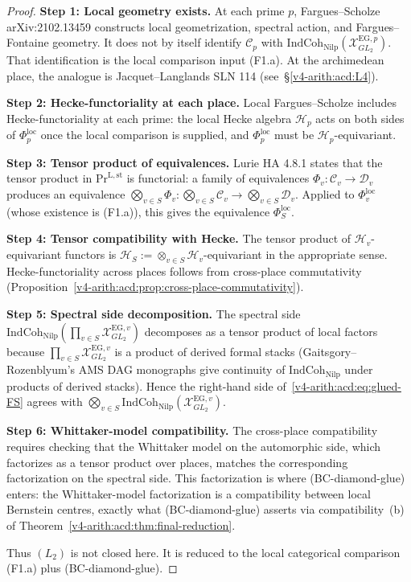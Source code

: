 \begin{proof}
\textbf{Step 1: Local geometry exists.} At each prime \(p\),
Fargues--Scholze arXiv:2102.13459 constructs local geometrization,
spectral action, and Fargues--Fontaine geometry. It does not by
itself identify \(\mathcal{C}_{p}\) with
\(\mathrm{IndCoh}_{\mathrm{Nilp}}(\mathcal{X}^{\mathrm{EG},p}_{GL_{2}})\).
That identification is the local comparison input (F1.a). At the
archimedean place, the analogue is Jacquet--Langlands SLN 114
(see~\S\ref{v4-arith:acd:L4}).

\textbf{Step 2: Hecke-functoriality at each place.} Local
Fargues--Scholze includes Hecke-functoriality at each prime: the
local Hecke algebra \(\mathcal{H}_{p}\) acts on both sides of
\(\Phi_{p}^{\mathrm{loc}}\) once the local comparison is supplied, and
\(\Phi_{p}^{\mathrm{loc}}\) must be
\(\mathcal{H}_{p}\)-equivariant.

\textbf{Step 3: Tensor product of equivalences.} Lurie HA 4.8.1
states that the tensor product in \(\mathrm{Pr}^{\mathrm{L,st}}\) is
functorial: a family of equivalences
\(\Phi_{v}:\mathcal{C}_{v}\to\mathcal{D}_{v}\) produces an equivalence
\(\bigotimes_{v\in S}\Phi_{v}:\bigotimes_{v\in S}\mathcal{C}_{v}\to\bigotimes_{v\in S}\mathcal{D}_{v}\).
Applied to \(\Phi_{v}^{\mathrm{loc}}\) (whose existence is (F1.a)),
this gives the equivalence \(\Phi_{S}^{\mathrm{loc}}\).

\textbf{Step 4: Tensor compatibility with Hecke.} The tensor product
of \(\mathcal{H}_{v}\)-equivariant functors is
\(\mathcal{H}_{S}:=\otimes_{v\in S}\mathcal{H}_{v}\)-equivariant in the
appropriate sense. Hecke-functoriality across places follows from
cross-place commutativity
(Proposition~\ref{v4-arith:acd:prop:cross-place-commutativity}).

\textbf{Step 5: Spectral side decomposition.} The spectral side
\(\mathrm{IndCoh}_{\mathrm{Nilp}}(\prod_{v\in S}\mathcal{X}^{\mathrm{EG},v}_{GL_{2}})\)
decomposes as a tensor product of local factors because
\(\prod_{v\in S}\mathcal{X}^{\mathrm{EG},v}_{GL_{2}}\) is a product of
derived formal stacks (Gaitsgory--Rozenblyum's AMS DAG monographs give
continuity of \(\mathrm{IndCoh}_{\mathrm{Nilp}}\) under products of
derived stacks). Hence the right-hand side
of~\eqref{v4-arith:acd:eq:glued-FS} agrees with
\(\bigotimes_{v\in S}\mathrm{IndCoh}_{\mathrm{Nilp}}(\mathcal{X}^{\mathrm{EG},v}_{GL_{2}})\).

\textbf{Step 6: Whittaker-model compatibility.} The cross-place
compatibility requires checking that the Whittaker model on the
automorphic side, which factorizes as a tensor product over places,
matches the corresponding factorization on the spectral side. This
factorization is where (BC-diamond-glue) enters: the Whittaker-model
factorization is a compatibility between local Bernstein centres,
exactly what (BC-diamond-glue) asserts via compatibility~(b) of
Theorem~\ref{v4-arith:acd:thm:final-reduction}.

Thus \((L_{2})\) is not closed here. It is reduced to the local
categorical comparison (F1.a) plus (BC-diamond-glue).
\end{proof}

